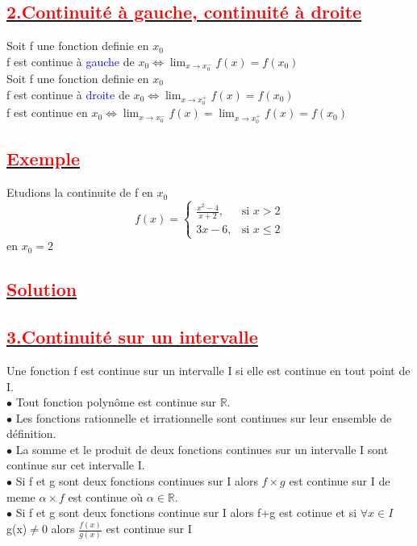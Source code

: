 \documentclass[12pt]{article}
\begin{document}
\subsection*{\underline{\textbf{\textcolor{red}{2.Continuité à gauche, continuité à droite}}}}
Soit f une fonction definie en $x_{0}$\\ 
f est continue à \textcolor{blue}{gauche} de $x_{0} \Leftrightarrow \lim_{x \to x_{0}^{-}}f(x)=f(x_{0})$\\
Soit f une fonction definie en $x_{0}$\\ 
f est continue à \textcolor{blue}{droite} de $x_{0} \Leftrightarrow \lim_{x \to x_{0}^{+}}f(x)=f(x_{0})$\\
f est continue en $x_{0} \Leftrightarrow \lim_{x \to x_{0}^{-}}f(x)=\lim_{x \to x_{0}^{+}}f(x)=f(x_{0})$
\subsection*{\underline{\textbf{\textcolor{red}{Exemple}}}}
Etudions la continuite de f en $x_{0}$\\
\[ f(x) = \begin{cases} 
  \frac{x^2-4}{x+2}, & \text{si } x > 2 \\
  3x-6, & \text{si } x\leq 2
\end{cases} \]
en $x_{0}=2$
\subsection*{\underline{\textbf{\textcolor{red}{Solution}}}}
\subsection*{\underline{\textbf{\textcolor{red}{3.Continuité sur un intervalle}}}}
Une fonction f est continue sur un intervalle I si elle est continue en tout point de I.\\
$\bullet$ Tout fonction polynôme est continue sur $\mathbb{R}$.\\
$\bullet$ Les fonctions rationnelle et irrationnelle sont continues sur leur ensemble de définition.\\
$\bullet$ La somme et le produit de deux fonctions continues sur un intervalle I sont continue sur cet intervalle I.\\
$\bullet$  Si f et g sont deux fonctions continues sur I alors $f \times g$ est continue sur I de meme $\alpha \times f$ est continue où $\alpha \in \mathbb{R}$.\\
$\bullet$ Si f et g sont deux fonctions continue sur I alors f+g est cotinue et si $\forall x \in I$ 
g(x)$\neq 0$  alors $\frac{f(x)}{g(x)}$ est continue sur I\\
\end{document}

